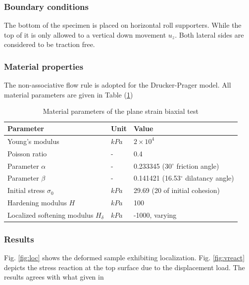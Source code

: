 \subsubsection*{Boundary conditions}

The bottom of the specimen is placed on horizontal roll supporters.
While the top of it is only allowed to a vertical down movement
$u_z$. Both lateral sides are considered to be traction free.

\subsubsection*{Material properties}

The non-associative flow rule is adopted for the Drucker-Prager model. All material parameters are given in Table (\ref{ex1:tableDP})

\begin{table}[H]
\centering
\begin{tabular}{lll}
\hline \hline
Parameter   &  Unit  & Value\\
\hline
  Young's modulus &  $kPa$ &  $2\times10^4$ \\
\hline\hline
  Poisson ratio & - &  0.4 \\
\hline
  Parameter $\alpha$  & - & 0.233345 (30$^\circ$ friction angle)\\
\hline
  Parameter $\beta$  & - &  0.141421 (16.53$^\circ$ dilatancy angle)\\
\hline
  Initial stress $\sigma_0$ & $kPa$ &  29.69 (20 of initial cohesion)\\
\hline
  Hardening modulus $H$ & $kPa$ &  100\\
\hline
  Localized softening modulus $H_{\delta}$ & $kPa$ & -1000, varying\\
\hline \hline
\end{tabular}
\caption{Material parameters of the plane strain biaxial test}
\label{ex1:tableDP}
\end{table}

\subsubsection*{Results}
Fig. \ref{fig:loc} shows the deformed sample exhibiting localization. Fig. \ref{fig:vreact} depicts the stress
reaction at the top surface due to the displacement load. The results agrees with what given in \cite{Bo00}

